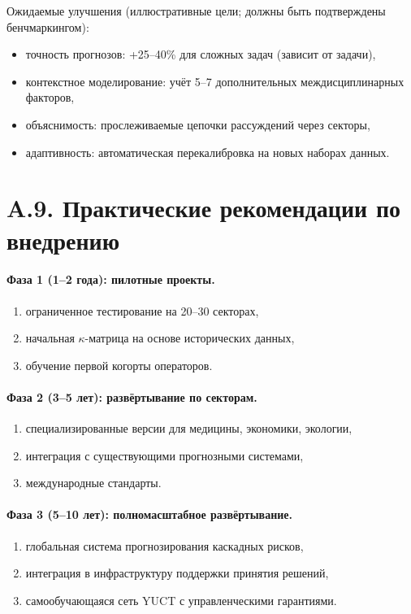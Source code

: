 \documentclass[11pt,a4paper]{article}
\begin{document}
	Ожидаемые улучшения (иллюстративные цели; должны быть подтверждены бенчмаркингом):
	\begin{itemize}[leftmargin=*]
		\item точность прогнозов: +25--40\% для сложных задач (зависит от задачи),
		\item контекстное моделирование: учёт 5–7 дополнительных междисциплинарных факторов,
		\item объяснимость: прослеживаемые цепочки рассуждений через секторы,
		\item адаптивность: автоматическая перекалибровка на новых наборах данных.
	\end{itemize}
	
	\section*{A.9. Практические рекомендации по внедрению}
	
	\paragraph{Фаза 1 (1--2 года): пилотные проекты.}
	\begin{enumerate}[leftmargin=*]
		\item ограниченное тестирование на 20–30 секторах,
		\item начальная $\kappa$-матрица на основе исторических данных,
		\item обучение первой когорты операторов.
	\end{enumerate}
	
	\paragraph{Фаза 2 (3–5 лет): развёртывание по секторам.}
	\begin{enumerate}[leftmargin=*]
		\item специализированные версии для медицины, экономики, экологии,
		\item интеграция с существующими прогнозными системами,
		\item международные стандарты.
	\end{enumerate}
	
	\paragraph{Фаза 3 (5–10 лет): полномасштабное развёртывание.}
	\begin{enumerate}[leftmargin=*]
		\item глобальная система прогнозирования каскадных рисков,
		\item интеграция в инфраструктуру поддержки принятия решений,
		\item самообучающаяся сеть YUCT с управленческими гарантиями.
	\end{enumerate}
	
\end{document}
